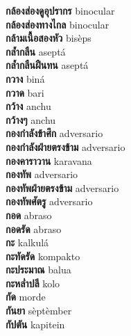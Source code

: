 \textbf{ กล้องส่องดูอุปรากร  } binocular \\
\textbf{ กล้องส่องทางไกล  } binocular \\
\textbf{ กล้ามเนื้อสองหัว  } bisèps \\
\textbf{ กล้ำกลืน  } aseptá \\
\textbf{ กล้ำกลืนฝืนทน  } aseptá \\
\textbf{ กวาง  } biná \\
\textbf{ กวาด  } bari \\
\textbf{ กว้าง  } anchu \\
\textbf{ กว้างๆ  } anchu \\
\textbf{ กองกำลังข้าศึก  } adversario \\
\textbf{ กองกำลังฝ่ายตรงข้าม  } adversario \\
\textbf{ กองคาราวาน  } karavana \\
\textbf{ กองทัพ  } adversario \\
\textbf{ กองทัพฝ่ายตรงข้าม  } adversario \\
\textbf{ กองทัพศัตรู  } adversario \\
\textbf{ กอด  } abraso \\
\textbf{ กอดรัด  } abraso \\
\textbf{ กะ  } kalkulá \\
\textbf{ กะทัดรัด  } kompakto \\
\textbf{ กะประมาณ  } balua \\
\textbf{ กะหล่ำปลี  } kolo \\
\textbf{ กัด  } morde \\
\textbf{ กันยา  } sèptèmber \\
\textbf{ กัปตัน  } kapitein \\
